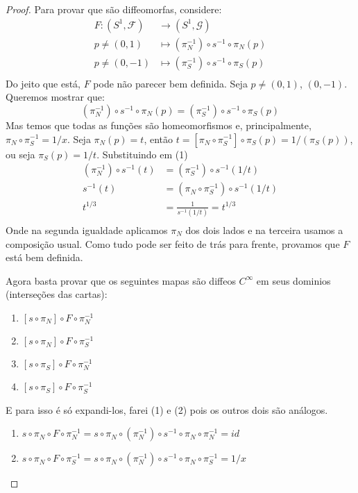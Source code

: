 \begin{proof}
    Para provar que são diffeomorfas, considere: 
    \begin{align*}
        F : (S^1, \mathcal{F}) &\to (S^1, \mathcal{G})\\
            p \neq (0,1) &\mapsto (\pi_N^{-1}) \circ s^{-1} \circ \pi_N (p) \\
            p \neq (0,-1) &\mapsto (\pi_S^{-1}) \circ s^{-1} \circ \pi_S (p) \\
    \end{align*}
    Do jeito que está, $F$ pode não parecer bem definida. Seja $p \neq (0,1)$, $(0,-1)$. Queremos mostrar que: 
    \begin{equation}
        (\pi_N^{-1}) \circ s^{-1} \circ \pi_N (p) = (\pi_S^{-1}) \circ s^{-1} \circ \pi_S (p)
    \end{equation}
    Mas temos que todas as funções são homeomorfismos e, principalmente, $\pi_N \circ \pi_S^{-1} = 1/x$.
    Seja $\pi_N(p) = t$, então $t = [\pi_N \circ \pi_S^{-1}] \circ \pi_S (p) = 1/(\pi_S(p))$, ou seja $\pi_S(p) = 1/t$. Substituindo em (1)
    \begin{align*}
        (\pi_N^{-1}) \circ s^{-1}(t) &= (\pi_S^{-1}) \circ s^{-1}(1/t)\\
        s^{-1}(t) &= (\pi_N \circ \pi_S^{-1}) \circ s^{-1}(1/t)\\
        t^{1/3} &= \frac{1}{s^{-1}(1/t)} = t^{1/3}\\
    \end{align*}
    Onde na segunda igualdade aplicamos $\pi_N$ dos dois lados e na terceira usamos a composição usual. Como tudo pode ser feito de trás para frente,
    provamos que $F$ está bem definida.

    Agora basta provar que os seguintes mapas são diffeos $C^\infty$ em seus dominios (interseções das cartas):
    \begin{enumerate}
        \item $[s \circ \pi_N] \circ F \circ \pi_N^{-1}$
        \item $[s \circ \pi_N] \circ F \circ \pi_S^{-1}$
        \item $[s \circ \pi_S] \circ F \circ \pi_N^{-1}$
        \item $[s \circ \pi_S] \circ F \circ \pi_S^{-1}$
    \end{enumerate}
    E para isso é só expandi-los, farei (1) e (2) pois os outros dois são análogos.
    \begin{enumerate}
        \item $s \circ \pi_N \circ F \circ \pi_N^{-1} = s \circ \pi_N \circ (\pi_N^{-1}) \circ s^{-1} \circ \pi_N \circ \pi_N^{-1} = id$
        \item $s \circ \pi_N \circ F \circ \pi_S^{-1} = s \circ \pi_N \circ (\pi_N^{-1}) \circ s^{-1} \circ \pi_N \circ \pi_S^{-1} = 1/x$
    \end{enumerate}
\end{proof}


